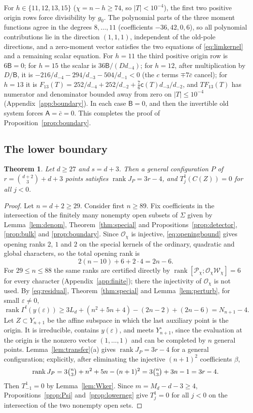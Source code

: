 \documentclass{amsart}
\newtheorem{theorem}{Theorem}[section]
\theoremstyle{definition}
\theoremstyle{remark}
\numberwithin{equation}{section}
\DeclareMathOperator{\rank}{rank}
\begin{document}
For $h\in\{11,12,13,15\}$ ($\chi=n-h\ge74$, so $|T|<10^{-4}$), the first two positive
origin rows force divisibility by $g_0$. The polynomial parts of the three moment
functions agree in the degrees $8,\dots,11$ (coefficients $-36,42,0,6$), so all
polynomial contributions lie in the direction $(1,1,1)$, independent of the old-pole
directions, and a zero-moment vector satisfies the two equations of
\eqref{eq:limkernel} and a remaining scalar equation. For $h=11$ the third positive
origin row is $6\mathsf B=0$; for $h=15$ the scalar is $36\mathsf B/(Dd_{-4})$; for
$h=12$, after multiplication by $D/\mathsf B$, it is
$-216/d_{-4}-294/d_{-3}-504/d_{-1}<0$ (the $c$ terms $\mp7\bar c$ cancel); for $h=13$ it is
$F_{13}(T)=252/d_{-4}+252/d_{-2}+\frac76\mathsf c(T)d_{-3}/d_{-2}$, and $TF_{13}(T)$ has
numerator and denominator bounded away from zero on $|T|\le10^{-4}$
(Appendix~\ref{app:boundary}). In each case
$\mathsf B=0$, and then the invertible old system forces $\mathsf A=\bar c=0$. This
completes the proof of Proposition~\ref{prop:boundary}.

\subsection{The lower boundary}
\begin{theorem}\label{thm:lowerboundary}
Let $d\ge27$ and $s=d+3$. Then a general configuration $P$ of $r=\binom{d+2}3+d+3$
points satisfies $\rank J_P=3r-4$, and $T^1_j(C(Z))=0$ for all $j<0$.
\end{theorem}

\begin{proof}
Let $n=d+2\ge29$. Consider first $n\ge89$. Fix coefficients in the intersection of
the finitely many nonempty open subsets of $\Sigma$ given by Lemma~\ref{lem:denom},
Theorem~\ref{thm:special} and Propositions~\ref{prop:detector}, \ref{prop:bulk} and
\ref{prop:boundary}. Since $\mathcal O_\chi$ is injective, \eqref{eq:openingbound} gives
opening ranks $2$, $1$ and $2$ on the special kernels of the ordinary, quadratic and
global characters, so the total opening rank is
\[
  2(n-10)+6+2\cdot4=2n-6 .
\]
For $29\le n\le88$ the same ranks are certified directly by
$\rank[\mathcal P_\chi;\mathcal O_\chi\mathcal W_\chi]=6$ for every character (Appendix~\ref{app:finite}); there the
injectivity of $\mathcal O_\chi$ is not used. By \eqref{eq:residual},
Theorem~\ref{thm:special} and Lemma~\ref{lem:perturb}, for small $\varepsilon\ne0$,
\[
  \rank\Gamma^{\mathrm f}(y(\varepsilon))\ge 3L_d+(n^2+5n+4)-(2n-2)+(2n-6)=N_{n+1}-4 .
\]
Let $Z\subset Y_{n+1}$ be the affine subspace in which the last auxiliary point is the
origin. It is irreducible, contains $y(\varepsilon)$, and meets $Y^\circ_{n+1}$, since
the evaluation at the origin is the nonzero vector $(1,\dots,1)$ and can be completed by
$n$ general points. Lemma~\ref{lem:transfer}(a) gives $\rank J_P=3r-4$ for a general
configuration; explicitly, after eliminating the injective $(n+1)^2$ coefficients
$\beta$,
\[
  \rank J_P=3\tbinom n3+n^2+5n-(n+1)^2=3\tbinom n3+3n-1=3r-4 .
\]
Then $T^1_{-1}=0$ by Lemma~\ref{lem:Wker}. Since $m=M_d-d-3\ge4$,
Propositions~\ref{prop:Psi} and~\ref{prop:lowerneg} give $T^1_j=0$ for all $j<0$ on
the intersection of the two nonempty open sets.
\end{proof}
\end{document}
